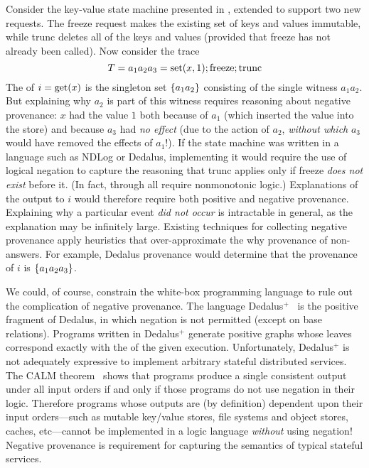 Consider the key-value state machine presented in ,
extended to support two new requests. The freeze request makes the existing set of keys and
values immutable, while trunc deletes all of the keys and values (provided that
freeze has not already been called). Now consider the trace
\[
  T = a_1 a_2 a_3 = \text{set}(x,1); \text{freeze}; \text{trunc}
\]
The \watprovenance{} of $i = \text{get}(x)$ is the singleton set $\{a_1a_2\}$
consisting of the single witness $a_1a_2$. But explaining why $a_2$ is part of
this witness requires reasoning about negative provenance: $x$ had the value $1$ both
because of $a_1$ (which inserted the value into the store) and because $a_3$
had \emph{no effect} (due to the action of $a_2$, \emph{without which} $a_3$ would have
removed the effects of $a_1$!). If the state machine was written in a language
such as NDLog or Dedalus, implementing it would require the use of logical
negation to capture the reasoning that trunc applies only if freeze \emph{does not exist} before it.
 (In fact,  through
 all require nonmonotonic logic.) Explanations of the output to $i$ would therefore require both positive and negative
provenance. Explaining why a particular event \emph{did not occur} is
intractable in general, as the explanation may be infinitely large.  Existing
techniques for collecting negative provenance apply heuristics that
over-approximate the why provenance of non-answers. For example, Dedalus
provenance would determine that the provenance of $i$ is $\{a_1a_2a_3\}$.

\newcommand{\dedalusplus}{Dedalus$^+$}
We could, of course, constrain the white-box programming language to rule out the
complication of negative provenance.  The language
\dedalusplus~\cite{marczak2012confluence} is the positive fragment of Dedalus,
in which negation is not permitted (except on base relations). Programs written
in \dedalusplus{} generate positive \whyprovenance{} graphs whose leaves
correspond exactly with the \watprovenance{} of the given execution.
Unfortunately, \dedalusplus{} is not adequately expressive to implement
arbitrary stateful distributed services. The CALM
theorem~\cite{alvaro2011consistency,ameloot2013transducers} shows that
programs produce a single consistent output under all input orders
if and only if those programs do not use negation in their logic. Therefore
programs whose outputs are (by definition) dependent upon their input
orders---such as mutable key/value stores, file systems and object stores,
caches, etc---cannot be implemented in a logic language \emph{without} using
negation! Negative provenance is requirement for capturing the semantics of
typical stateful services.

